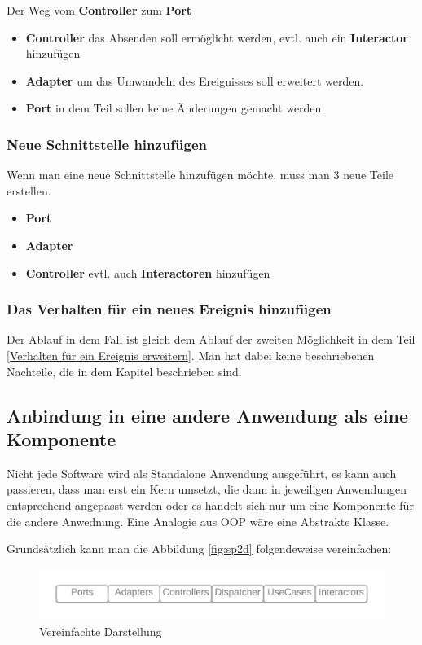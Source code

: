 \documentclass{article}
\begin{document}
    Der Weg vom \textbf{Controller} zum \textbf{Port}
    \begin{itemize}
        \item \textbf{Controller} das Absenden soll ermöglicht werden, evtl. auch ein \textbf{Interactor} hinzufügen
        \item \textbf{Adapter} um das Umwandeln des Ereignisses soll erweitert werden.
        \item \textbf{Port} in dem Teil sollen keine Änderungen gemacht werden.
    \end{itemize}

    \newpage
    \subsubsection{Neue Schnittstelle hinzufügen}
    Wenn man eine neue Schnittstelle hinzufügen möchte, muss man 3 neue Teile erstellen.
    \begin{itemize}
        \item \textbf{Port}
        \item \textbf{Adapter}
        \item \textbf{Controller} evtl. auch \textbf{Interactoren} hinzufügen
    \end{itemize}

    \subsubsection{Das Verhalten für ein neues Ereignis hinzufügen}
    Der Ablauf in dem Fall ist gleich dem Ablauf der zweiten Möglichkeit in dem Teil \ref{Verhalten für ein Ereignis erweitern}.
    Man hat dabei keine beschriebenen Nachteile, die in dem Kapitel beschrieben sind.
    
    \newpage
    \subsection{Anbindung in eine andere Anwendung als eine Komponente}
    Nicht jede Software wird als Standalone Anwendung ausgeführt, es kann auch passieren, dass man 
    erst ein Kern umsetzt, die dann in jeweiligen Anwendungen entsprechend angepasst werden 
    oder es handelt sich nur um eine Komponente für die andere Anwednung.
    Eine Analogie aus OOP wäre eine Abstrakte Klasse.

    Grundsätzlich kann man die Abbildung \ref{fig:sp2d} folgendeweise vereinfachen:
    \begin{figure}[H]
        \centering
        \includegraphics[width=1\textwidth]{./images/SimpliedArchitecture.png}
        \caption{Vereinfachte Darstellung}
        \label{fig:SimpliedArchitecture}
    \end{figure}
\end{document}
